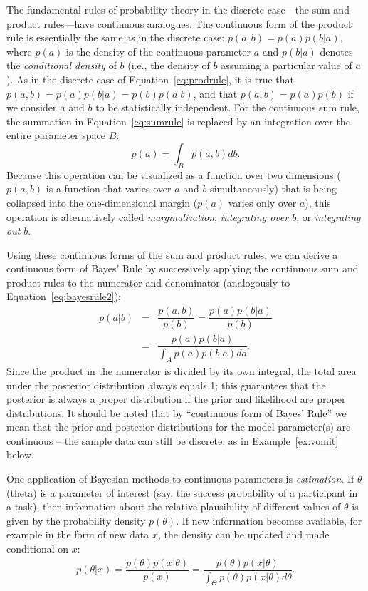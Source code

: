 The fundamental rules of probability theory in the discrete case---the sum and product rules---have continuous analogues. The continuous form of the product rule is essentially the same as in the discrete case: $p(a,b) = p(a)p(b|a)$, where $p(a)$ is the density of the continuous parameter $a$ and $p(b|a)$ denotes the \textit{conditional density} of $b$ (i.e., the density of $b$ assuming a particular value of $a$). As in the discrete case of Equation~\ref{eq:prodrule}, it is true that $p(a,b) = p(a)p(b|a) = p(b)p(a|b)$, and that $p(a,b)=p(a)p(b)$ if we consider $a$ and $b$ to be statistically independent. For the continuous sum rule, the summation in Equation~\ref{eq:sumrule} is replaced by an integration over the entire parameter space $B$: $$p(a) = \int_B p(a,b)db.$$ Because this operation can be visualized as a function over two dimensions ($p(a,b)$ is a function that varies over $a$ and $b$ simultaneously) that is being collapsed into the one-dimensional margin ($p(a)$ varies only over $a$), this operation is alternatively called \emph{marginalization}, \emph{integrating over $b$}, or \emph{integrating out $b$}.

Using these continuous forms of the sum and product rules, we can derive a continuous form of Bayes' Rule by successively applying the continuous sum and product rules to the numerator and denominator (analogously to Equation~\ref{eq:bayesrule2}):
\begin{equation}
  \begin{array}{rcl}
    p(a|b) &=& \dfrac{p(a,b)}{p(b)} = \dfrac{p(a)p(b|a)}{p(b)}\\[3ex]
           &=& \dfrac{p(a)p(b|a)}{\int_A p(a)p(b|a)da}.
  \end{array}
  \label{eq:bayesrule3}
\end{equation}
Since the product in the numerator is divided by its own integral, the total area under the posterior distribution always equals 1; this guarantees that the posterior is always a proper distribution if the prior and likelihood are proper distributions. It should be noted that by ``continuous form of Bayes' Rule'' we mean that the prior and posterior distributions for the model parameter(s) are continuous -- the sample data can still be discrete, as in Example~{\ref{ex:vomit}} below.

One application of Bayesian methods to continuous parameters is \emph{estimation}.  If $\theta$ (theta) is a parameter of interest (say, the success probability of a participant in a task), then information about the relative plausibility of different values of $\theta$ is given by the probability density $p(\theta)$. If new information becomes available, for example in the form of new data $x$, the density can be updated and made conditional on $x$: 
\begin{equation}
  \begin{array}{rcl}
    p(\theta|x) = \dfrac{p(\theta)p(x|\theta)}{p(x)} 
                = \dfrac{p(\theta)p(x|\theta)}{\int_\Theta p(\theta)p(x|\theta)d\theta} .
  \end{array}
  \label{eq:bayesrule4}
\end{equation}

